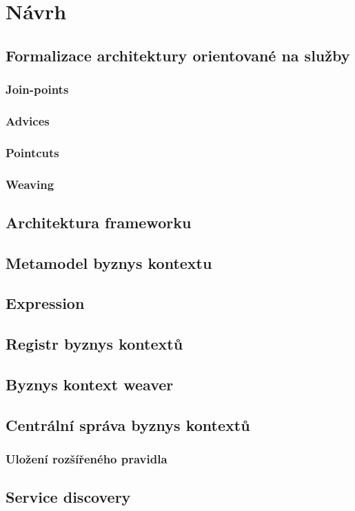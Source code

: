\usepackage[T1]{fontenc}
\usepackage[utf8]{inputenc}


\chapter{Návrh}\label{ch:navrh}

\section{Formalizace architektury orientované na služby}

\subsection{Join-points}

\subsection{Advices}

\subsection{Pointcuts}

\subsection{Weaving}

\section{Architektura frameworku}

\section{Metamodel byznys kontextu}\label{sec:metamodel}

\section{Expression}

\section{Registr byznys kontextů}

\section{Byznys kontext weaver}

\section{Centrální správa byznys kontextů}

\subsection{Uložení rozšířeného pravidla}


\section{Service discovery}

